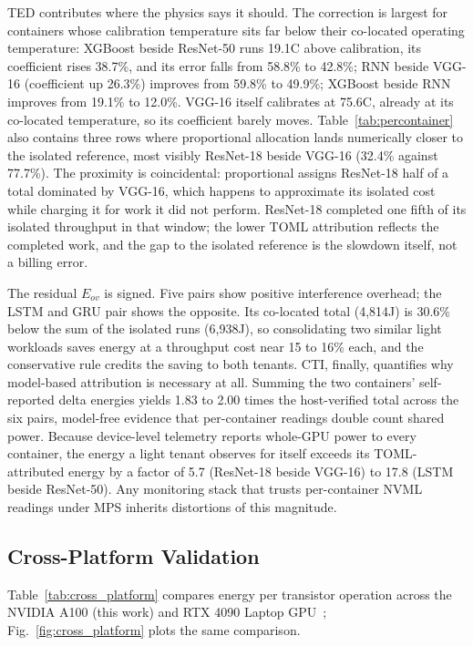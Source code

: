 \documentclass[conference]{IEEEtran}
\begin{document}
TED contributes where the physics says it should. The correction is largest for containers whose calibration temperature sits far below their co-located operating temperature: XGBoost beside ResNet-50 runs 19.1\textdegree C above calibration, its coefficient rises 38.7\%, and its error falls from 58.8\% to 42.8\%; RNN beside VGG-16 (coefficient up 26.3\%) improves from 59.8\% to 49.9\%; XGBoost beside RNN improves from 19.1\% to 12.0\%. VGG-16 itself calibrates at 75.6\textdegree C, already at its co-located temperature, so its coefficient barely moves. Table~\ref{tab:percontainer} also contains three rows where proportional allocation lands numerically closer to the isolated reference, most visibly ResNet-18 beside VGG-16 (32.4\% against 77.7\%). The proximity is coincidental: proportional assigns ResNet-18 half of a total dominated by VGG-16, which happens to approximate its isolated cost while charging it for work it did not perform. ResNet-18 completed one fifth of its isolated throughput in that window; the lower TOML attribution reflects the completed work, and the gap to the isolated reference is the slowdown itself, not a billing error.

The residual $E_{ov}$ is signed. Five pairs show positive interference overhead; the LSTM and GRU pair shows the opposite. Its co-located total (4,814J) is 30.6\% below the sum of the isolated runs (6,938J), so consolidating two similar light workloads saves energy at a throughput cost near 15 to 16\% each, and the conservative rule credits the saving to both tenants. CTI, finally, quantifies why model-based attribution is necessary at all. Summing the two containers' self-reported delta energies yields 1.83 to 2.00 times the host-verified total across the six pairs, model-free evidence that per-container readings double count shared power. Because device-level telemetry reports whole-GPU power to every container, the energy a light tenant observes for itself exceeds its TOML-attributed energy by a factor of 5.7 (ResNet-18 beside VGG-16) to 17.8 (LSTM beside ResNet-50). Any monitoring stack that trusts per-container NVML readings under MPS inherits distortions of this magnitude.

\subsection{Cross-Platform Validation}

Table~\ref{tab:cross_platform} compares energy per transistor operation across the NVIDIA A100 (this work) and RTX 4090 Laptop GPU~\cite{syed2026toml}; Fig.~\ref{fig:cross_platform} plots the same comparison.
\end{document}
